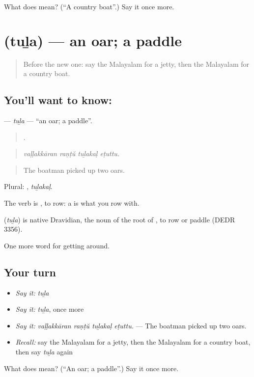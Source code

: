 \begin{tcolorbox}[breakable,colback=teal!4,colframe=teal!35!black,title={Before you move on}]
What does  mean? (\textquotedblleft{}A country boat\textquotedblright{}.) Say it once more.
\end{tcolorbox}
\section[\texorpdfstring{\ml{തുഴ} (tuḻa)}{തുഴ (tuḻa)}]{ (tuḻa) — an oar; a paddle}

\label{lesson:ML-C475-tula}



\begin{quote}
Before the new one: say the Malayalam for a jetty, then the Malayalam for a country boat.
\end{quote}

\subsection*{You'll want to know: }
\textbf{} — \emph{tuḻa} — \textquotedblleft{}an oar; a paddle\textquotedblright{}.

\begin{quote}
   .
\end{quote}

\begin{quote}
\emph{vaḷḷakkāran raṇṭŭ tuḻakaḷ eṭuttu.}
\end{quote}

\begin{quote}
The boatman picked up two oars.
\end{quote}

Plural: , \emph{tuḻakaḷ}.

The verb is , to row: a  is what you row with.

\begin{cousinweb}
\textbf{} (\emph{tuḻa}) is native Dravidian, the noun of the root of , to row or paddle (DEDR 3356).
\end{cousinweb}

\begin{grammarlens}[title={What you've built}]
One more word for getting around.
\end{grammarlens}

\subsection*{Your turn}
\begin{itemize}
\raggedright
  \item \emph{Say it:} \emph{tuḻa}
  \item \emph{Say it:} \emph{tuḻa}, once more
  \item \emph{Say it:} \emph{vaḷḷakkāran raṇṭŭ tuḻakaḷ eṭuttu.} — The boatman picked up two oars.
  \item \emph{Recall:} say the Malayalam for a jetty, then the Malayalam for a country boat, then say \emph{tuḻa} again
\end{itemize}

\begin{tcolorbox}[breakable,colback=teal!4,colframe=teal!35!black,title={Before you move on}]
What does  mean? (\textquotedblleft{}An oar; a paddle\textquotedblright{}.) Say it once more.
\end{tcolorbox}
